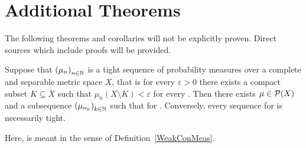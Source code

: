\chapter*{Additional Theorems}\label{appendix}

\setcounter{theorem}{0}
\renewcommand\thetheorem{A.\arabic{theorem}}

The following theorems and corollaries will not be explicitly proven. Direct sources which include proofs will be provided.




\begin{theorem}\label{Prok}
	Suppose that ${(\mu_n)}_{\NinN}$ is a tight sequence of probability measures over a complete and separable metric space $X$, that is for every $\varepsilon > 0$ there exists a compact subset $K \subseteq X$ such that $\mu_n(X \setminus K) < \varepsilon$ for every \NinN. Then there exists $\mu \in \PM{X}$ and a subsequence ${(\mu_{n_k})}_{\NinN[k]}$ such that  for \Ninf[k]. Conversely, every sequence  for \Ninf{} is necessarily tight.

	Here,  is meant in the sense of Definition~\ref{WeakConMeas}.
\end{theorem}

